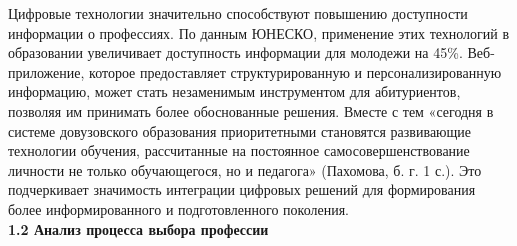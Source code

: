 Цифровые технологии значительно способствуют повышению доступности информации о профессиях. По данным ЮНЕСКО, применение этих 
технологий в образовании увеличивает доступность информации для молодежи на 45\%. Веб-приложение, которое предоставляет 
структурированную и персонализированную информацию, может стать незаменимым инструментом для абитуриентов, позволяя им 
принимать более обоснованные решения. Вместе с тем «сегодня в системе довузовского образования приоритетными становятся 
развивающие технологии обучения, рассчитанные на постоянное самосовершенствование личности не только обучающегося, но и педагога» 
(Пахомова, б. г. 1 с.). Это подчеркивает значимость интеграции цифровых решений для формирования более информированного и 
подготовленного поколения.\\

\textbf{1.2 Анализ процесса выбора профессии}
